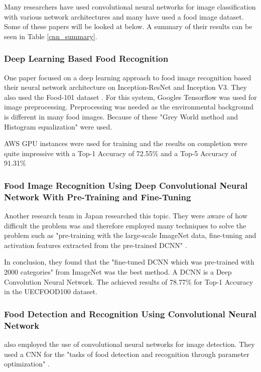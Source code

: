 Many researchers have used convolutional neural networks for image
classification with various network architectures and many have used a food image dataset.
Some of these papers will be looked at below.
A summary of their results can be seen in Table \ref{cnn_summary}.

\subsubsection*{Deep Learning Based Food Recognition}
One paper focused on a deep learning approach to food image recognition based
their neural network architecture on Inception-ResNet and Inception V3. They
also used the Food-101 dataset \textcite{deepLearning}. For this system, Googles
Tensorflow was used for image preprocessing. Preprocessing was needed as the
environmental background is different in many food images. Because of these
"Grey World method and Histogram equalization" \textcite{deepLearning} were
used.

AWS GPU instances were used for training and the results on completion were
quite impressive with a Top-1 Accuracy of 72.55\% and a Top-5 Accuracy of
91.31\% \textcite{deepLearning}

\subsubsection*{Food Image Recognition Using Deep Convolutional Neural Network
With Pre-Training and Fine-Tuning}
Another research team in Japan researched this topic. They were aware of how
difficult the problem was and therefore employed many techniques to solve the
problem such as "pre-training with the large-scale ImageNet data, fine-tuning
and activation features extracted from the pre-trained DCNN"
\textcite{yanaiFood}. 

In conclusion, they found that the "fine-tuned DCNN which was pre-trained
with 2000 categories" \textcite{yanaiFood} from ImageNet was the best method. A
DCNN is a Deep Convolution Neural Network. The achieved results of 78.77\% for
Top-1 Accuracy in the UECFOOD100 dataset.

\subsubsection*{Food Detection and Recognition Using Convolutional Neural Network}
\textcite{kagayaFood} also employed the use of convolutional neural networks for
image detection. They used a CNN for the "tasks of food detection and recognition
through parameter optimization" \textcite{kagayaFood}.

